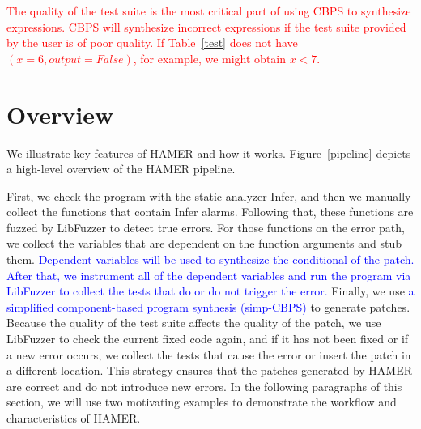 \documentclass[a4j,dvipdfmx]{article}
\begin{document}
\textcolor{red}{
The quality of the test suite is the most critical part of using CBPS to synthesize expressions. CBPS will synthesize incorrect expressions if the test suite provided by the user is of poor quality. If Table~\ref{test} does not have $(x=6, output=False)$, for example, we might obtain $x<7$.
}


\section{Overview}

We illustrate key features of HAMER and how it works. Figure~\ref{pipeline} depicts a high-level overview of the HAMER pipeline.

First, we check the program with the static analyzer \mbox{Infer}, and then we manually collect the functions that contain Infer alarms. Following that, these functions are fuzzed by LibFuzzer to detect true errors.  For those functions on the error path, we collect the variables that are dependent on the function arguments and stub them. \textcolor{blue}{Dependent variables will be used to synthesize the conditional of the patch. After that, we instrument all of the dependent variables and run the program via LibFuzzer to collect the tests that do or do not trigger the error.} Finally, we use \textcolor{blue}{a simplified component-based program synthesis (simp-CBPS)} to generate patches. Because the quality of the test suite affects the quality of the patch, we use LibFuzzer to check the current fixed code again, and if it has not been fixed or if a new error occurs, we collect the tests that cause the error or insert the patch in a different location. This strategy ensures that the patches generated by HAMER are correct and do not introduce new errors. In the following paragraphs of this section, we will use two motivating examples to demonstrate the workflow and characteristics of HAMER.
\end{document}
